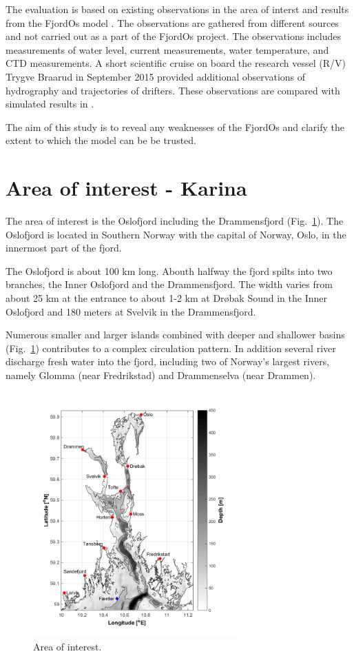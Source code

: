 \documentclass[12pt,a4paper,english]{article}
\begin{document}
The evaluation is based on existing observations in the area of interst and results from the FjordOs model \citep{roed:etal:2016}. The observations are gathered from different sources and not carried out as a part of the FjordOs project. The observations includes measurements of water level, current measurements, water temperature, and CTD measurements. A short scientific cruise on board the research vessel (R/V) Trygve Braarud in September 2015 provided additional observations of hydrography and trajectories of drifters. These observations are compared with simulated results in \cite{hjelm:etal:2016}.

The aim of this study is to reveal any weaknesses of the FjordOs and clarify the extent to which the model can be be trusted.

\newpage
\section{Area of interest - Karina}

The area of interest is the Oslofjord including the Drammensfjord (Fig.~\ref{fig:kart}). The Oslofjord is located in Southern Norway with the capital of Norway, Oslo, in the innermost part of the fjord. 

The Oslofjord is about 100 km long. Abouth halfway the fjord spilts into two branches, the Inner Oslofjord and the Drammensfjord. The width varies from about 25 km at the entrance to about 1-2 km at Dr\o bak Sound in the Inner Oslofjord and 180 meters at Svelvik in the Drammensfjord.

Numerous smaller and larger islands combined with deeper and shallower basins (Fig.~\ref{fig:kart}) contributes to a complex circulation pattern. In addition several river discharge fresh water into the fjord, including two of Norway's largest rivers, namely Glomma (near Fredrikstad) and Drammenselva (near Drammen).

\begin{figure}[htb]
\centerline{
\includegraphics*[trim=0cm 0.8cm 0cm 0cm,clip=true,width=0.7\textwidth]{Figurer/kart}
}
\caption{\small
Area of interest. 
}
\label{fig:kart}
\end{figure}
\end{document}
